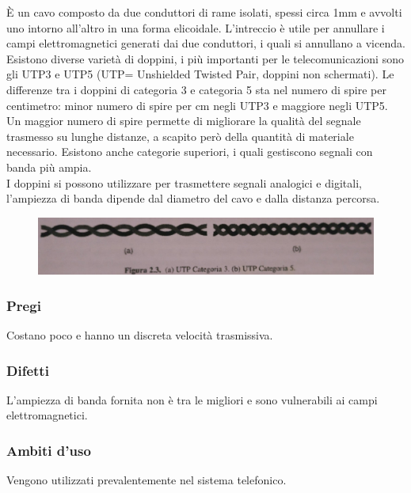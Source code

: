 È un cavo composto da due conduttori di rame isolati, spessi circa 1mm e avvolti uno intorno all’altro in una forma elicoidale. L’intreccio è utile per annullare i campi elettromagnetici generati dai due conduttori, i quali si annullano a vicenda. Esistono diverse varietà di doppini, i più importanti per le telecomunicazioni sono gli UTP3 e UTP5 (UTP= Unshielded Twisted Pair, doppini non schermati). Le differenze tra i doppini di categoria 3 e categoria 5 sta nel numero di spire per centimetro: minor numero di spire per cm negli UTP3 e maggiore negli UTP5. Un maggior numero di spire permette di migliorare la qualità del segnale trasmesso su lunghe distanze, a scapito però della quantità di materiale necessario. Esistono anche categorie superiori, i quali gestiscono segnali con banda più ampia.  \\
I doppini si possono utilizzare per trasmettere segnali analogici e digitali, l’ampiezza di banda dipende dal diametro del cavo e dalla distanza percorsa.

\begin{figure}[H]
\centering
\includegraphics[scale=0.7]{res/img/3_Doppino.jpg}
\end{figure}


\subsubsection{Pregi}
Costano poco e hanno un discreta velocità trasmissiva.

\subsubsection{Difetti}
L'ampiezza di banda fornita non è tra le migliori e sono vulnerabili ai campi elettromagnetici.

\subsubsection{Ambiti d'uso}
Vengono utilizzati prevalentemente nel sistema telefonico.

